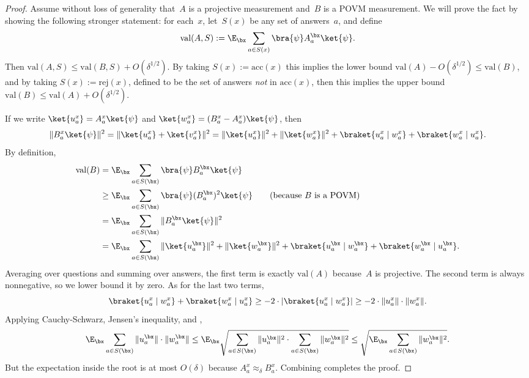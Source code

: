 \documentclass[11pt]{article}
\begin{document}
\begin{proof}
Assume without loss of generality that~$A$ is a projective measurement and~$B$ is a POVM measurement.
We will prove the fact by showing the following stronger statement:
for each~$x$, let~$S(x)$ be any set of answers~$a$,
and define
\begin{equation*}
\mathrm{val}(A,S) := \E_\bx \sum_{a \in S(x)} \bra{\psi} A^{\bx}_a\ket{\psi}.
\end{equation*}
Then $\mathrm{val}(A,S) \leq \mathrm{val}(B,S) + O(\delta^{1/2})$.
By taking $S(x) := \mathrm{acc}(x)$ this implies the lower bound $\mathrm{val}(A) - O(\delta^{1/2}) \leq \mathrm{val}(B)$,
and by taking $S(x) := \mathrm{rej}(x)$, defined to be the set of answers \emph{not} in $\mathrm{acc}(x)$,
then this implies the upper bound $\mathrm{val}(B) \leq \mathrm{val}(A) + O(\delta^{1/2})$.

If we write $\ket{u_a^x} = A_{a}^{x}  \ket{\psi}$
	and $\ket{w_a^x} = (B_{a}^{x} - A_{a}^{x}) \ket{\psi}$, then
\begin{equation*}
\Vert B_{a}^{x} \ket{\psi} \Vert^2
= \Vert \ket{u_a^x} + \ket{v_a^x} \Vert^2
 = \Vert\ket{u_a^x}\Vert^2 + \Vert\ket{w_a^x}\Vert^2
 + \braket{u_a^x \mid w_a^x} + \braket{w_a^x \mid u_a^x}.
\end{equation*}
By definition,
\begin{align*}
\mathrm{val}(B)
& = \E_{\bx} \sum_{a\in S(\bx)} \bra{\psi} B_{a}^{\bx} \ket{\psi}\\
& \geq \E_{\bx} \sum_{a\in S(\bx)} \bra{\psi} (B_{a}^{\bx})^2 \ket{\psi}\tag{because~$B$ is a POVM}\\
& = \E_{\bx} \sum_{a\in S(\bx)}\Vert B_{a}^{\bx} \ket{\psi} \Vert^2\\
& = \E_{\bx} \sum_{a\in S(\bx)} \Vert\ket{u_a^{\bx}}\Vert^2 + \Vert\ket{w_a^{\bx}}\Vert^2
		 + \braket{u_a^{\bx} \mid w_a^{\bx}} + \braket{w_a^{\bx} \mid u_a^{\bx}}.
\end{align*}
Averaging over questions and summing over answers, the first term is exactly $\mathrm{val}(A)$ because~$A$ is projective.
The second term is always nonnegative, so we lower bound it by zero.
As for the last two terms,
\begin{equation}\label{eq:our-powers-combined--wind!}
\braket{u_a^x \mid w_a^x} + \braket{w_a^x \mid u_a^x}
\geq - 2 \cdot |\braket{u_a^x \mid w_a^x}| 
\geq -2 \cdot \Vert u_a^x \Vert \cdot \Vert w_a^x \Vert.
\end{equation}
Applying Cauchy-Schwarz,
Jensen's inequality,
and ,
\begin{equation}\label{eq:our-powers-combined--heart!}
\E_{\bx} \sum_{a \in S(\bx)} \Vert u_a^{\bx} \Vert \cdot \Vert w_a^{\bx} \Vert
\leq \E_{\bx} \sqrt{\sum_{a \in S(\bx)} \Vert u_a^{\bx} \Vert^2 \cdot  \sum_{a \in S(\bx)}\Vert w_a^{\bx}\Vert^2 }
\leq \sqrt{\E_{\bx} \sum_{a \in S(\bx)}\Vert w_a^{\bx}\Vert^2 }.
\end{equation}
But the expectation inside the root is at most $O(\delta)$ because $A^{x}_a \approx_{\delta} B^{x}_a$.
Combining  completes the proof.
\end{proof}
\end{document}
